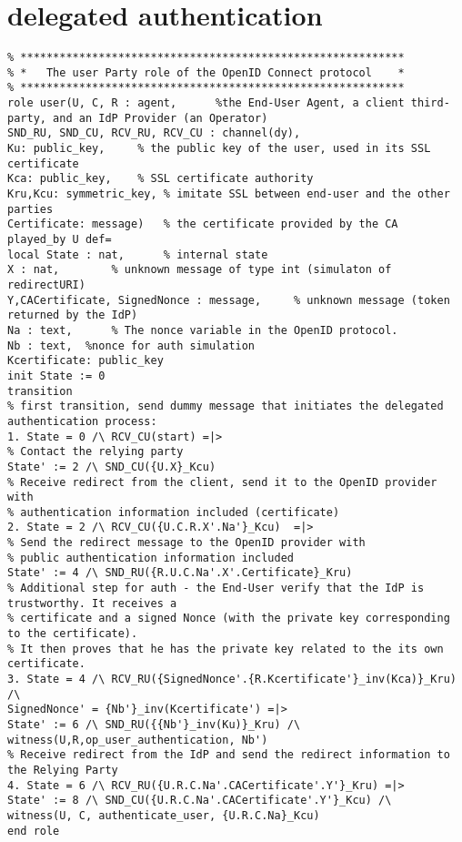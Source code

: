 \section{delegated authentication}


	\lstset{language=HLPSL}
	\begin{lstlisting}
% ***********************************************************
% *   The user Party role of the OpenID Connect protocol    *
% ***********************************************************
role user(U, C, R : agent, 		%the End-User Agent, a client third-party, and an IdP Provider (an Operator)
SND_RU, SND_CU, RCV_RU, RCV_CU : channel(dy),
Ku: public_key,		% the public key of the user, used in its SSL certificate
Kca: public_key, 	% SSL certificate authority
Kru,Kcu: symmetric_key, % imitate SSL between end-user and the other parties
Certificate: message)	% the certificate provided by the CA
played_by U	def=
local State : nat, 		% internal state 
X : nat,		% unknown message of type int (simulaton of redirectURI)
Y,CACertificate, SignedNonce : message,		% unknown message (token returned by the IdP)
Na : text, 		% The nonce variable in the OpenID protocol.
Nb : text,	%nonce for auth simulation
Kcertificate: public_key
init State := 0
transition
% first transition, send dummy message that initiates the delegated authentication process:
1. State = 0 /\ RCV_CU(start) =|>
% Contact the relying party
State' := 2 /\ SND_CU({U.X}_Kcu)
% Receive redirect from the client, send it to the OpenID provider with 
% authentication information included (certificate)
2. State = 2 /\ RCV_CU({U.C.R.X'.Na'}_Kcu)  =|>
% Send the redirect message to the OpenID provider with 
% public authentication information included
State' := 4 /\ SND_RU({R.U.C.Na'.X'.Certificate}_Kru) 
% Additional step for auth - the End-User verify that the IdP is trustworthy. It receives a 
% certificate and a signed Nonce (with the private key corresponding to the certificate).
% It then proves that he has the private key related to the its own certificate.
3. State = 4 /\ RCV_RU({SignedNonce'.{R.Kcertificate'}_inv(Kca)}_Kru) /\
SignedNonce' = {Nb'}_inv(Kcertificate') =|> 
State' := 6 /\ SND_RU({{Nb'}_inv(Ku)}_Kru) /\ witness(U,R,op_user_authentication, Nb')
% Receive redirect from the IdP and send the redirect information to the Relying Party
4. State = 6 /\ RCV_RU({U.R.C.Na'.CACertificate'.Y'}_Kru) =|>
State' := 8 /\ SND_CU({U.R.C.Na'.CACertificate'.Y'}_Kcu) /\
witness(U, C, authenticate_user, {U.R.C.Na}_Kcu)
end role


\end{lstlisting}
